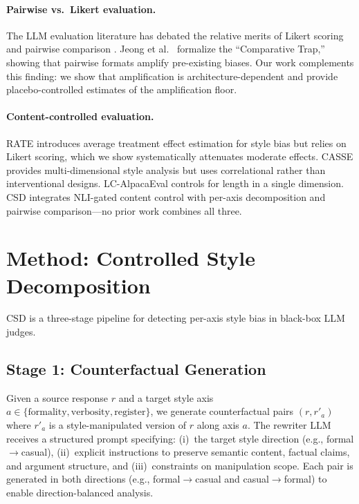 \documentclass[11pt]{article}
\begin{document}
\paragraph{Pairwise vs.\ Likert evaluation.} The LLM evaluation literature has debated the relative merits of Likert scoring and pairwise comparison \cite{zheng2024judging}. Jeong et al.\  formalize the ``Comparative Trap,'' showing that pairwise formats amplify pre-existing biases. Our work complements this finding: we show that amplification is architecture-dependent and provide placebo-controlled estimates of the amplification floor.

\paragraph{Content-controlled evaluation.} RATE \cite{ye2024rate} introduces average treatment effect estimation for style bias but relies on Likert scoring, which we show systematically attenuates moderate effects. CASSE \cite{wu2024casse} provides multi-dimensional style analysis but uses correlational rather than interventional designs. LC-AlpacaEval \cite{dubois2024length} controls for length in a single dimension. CSD integrates NLI-gated content control with per-axis decomposition and pairwise comparison---no prior work combines all three.

\section{Method: Controlled Style Decomposition}

CSD is a three-stage pipeline for detecting per-axis style bias in black-box LLM judges.

\subsection{Stage 1: Counterfactual Generation}

Given a source response $r$ and a target style axis $a \in \{\text{formality}, \text{verbosity}, \text{register}\}$, we generate counterfactual pairs $(r, r'_a)$ where $r'_a$ is a style-manipulated version of $r$ along axis $a$. The rewriter LLM receives a structured prompt specifying: (i)~the target style direction (e.g., formal$\to$casual), (ii)~explicit instructions to preserve semantic content, factual claims, and argument structure, and (iii)~constraints on manipulation scope. Each pair is generated in both directions (e.g., formal$\to$casual and casual$\to$formal) to enable direction-balanced analysis.
\end{document}
